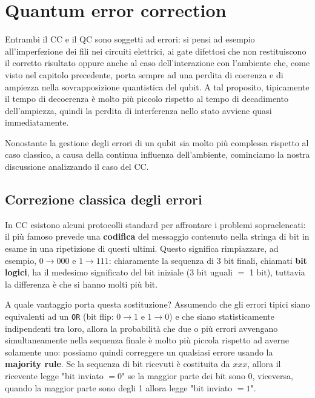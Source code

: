 \chapter{Quantum error correction}

\vspace{0.5cm}

\noindent Entrambi il CC e il QC sono soggetti ad errori: si pensi ad esempio all'imperfezione dei fili nei circuiti elettrici, ai gate difettosi che non restituiscono il corretto risultato oppure anche al caso dell'interazione con l'ambiente che, come visto nel capitolo precedente, porta sempre ad una perdita di coerenza e di ampiezza nella sovrapposizione quantistica del qubit. A tal proposito, tipicamente il tempo di decoerenza è molto più piccolo rispetto al tempo di decadimento dell'ampiezza, quindi la perdita di interferenza nello stato avviene quasi immediatamente. 

\noindent Nonostante la gestione degli errori di un qubit sia molto più complessa rispetto al caso classico, a causa della continua influenza dell'ambiente, cominciamo la nostra discussione analizzando il caso del CC.

\section{Correzione classica degli errori}\label{sec:classical_correction}
In CC esistono alcuni protocolli standard per affrontare i problemi sopraelencati: il più famoso prevede una \textbf{codifica} del messaggio contenuto nella stringa di bit in esame in una ripetizione di questi ultimi. Questo significa rimpiazzare, ad esempio, $0 \to 000$ e $1 \to 111$: chiaramente la sequenza di 3 bit finali, chiamati \textbf{bit logici}, ha il medesimo significato del bit iniziale (3 bit uguali $=$ 1 bit), tuttavia la differenza è che si hanno molti più bit. 

\noindent A quale vantaggio porta questa sostituzione? Assumendo che gli errori tipici siano equivalenti ad un \texttt{OR} (bit flip: $0 \to 1$ e $1 \to 0$) e che siano statisticamente indipendenti tra loro, allora la probabilità che due o più errori avvengano simultaneamente nella sequenza finale è molto più piccola rispetto ad averne solamente uno: possiamo quindi correggere un qualsiasi errore usando la \textbf{majority rule}. Se la sequenza di bit ricevuti è costituita da $xxx$, allora il ricevente legge "bit inviato $= 0$" se la maggior parte dei bit sono 0, viceversa, quando la maggior parte sono degli 1 allora legge "bit inviato $= 1$". 

